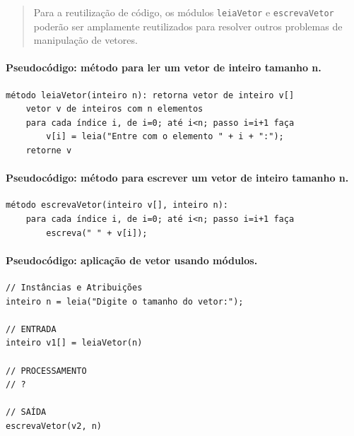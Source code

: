 \documentclass[12pt,a4paper]{article}
\begin{document}
\begin{quote}
Para a reutilização de código, os módulos \texttt{leiaVetor} e
\texttt{escrevaVetor} poderão ser amplamente reutilizados para resolver
outros problemas de manipulação de vetores.
\end{quote}

    \hypertarget{pseudocuxf3digo-muxe9todo-para-ler-um-vetor-de-inteiro-tamanho-n.}{%
\paragraph{Pseudocódigo: método para ler um vetor de inteiro tamanho
n.}\label{pseudocuxf3digo-muxe9todo-para-ler-um-vetor-de-inteiro-tamanho-n.}}

    \begin{verbatim}
método leiaVetor(inteiro n): retorna vetor de inteiro v[]
    vetor v de inteiros com n elementos
    para cada índice i, de i=0; até i<n; passo i=i+1 faça
        v[i] = leia("Entre com o elemento " + i + ":");
    retorne v
\end{verbatim}

    \hypertarget{pseudocuxf3digo-muxe9todo-para-escrever-um-vetor-de-inteiro-tamanho-n.}{%
\paragraph{Pseudocódigo: método para escrever um vetor de inteiro
tamanho
n.}\label{pseudocuxf3digo-muxe9todo-para-escrever-um-vetor-de-inteiro-tamanho-n.}}

    \begin{verbatim}
método escrevaVetor(inteiro v[], inteiro n):
    para cada índice i, de i=0; até i<n; passo i=i+1 faça
        escreva(" " + v[i]);
\end{verbatim}

    \hypertarget{pseudocuxf3digo-aplicauxe7uxe3o-de-vetor-usando-muxf3dulos.}{%
\paragraph{Pseudocódigo: aplicação de vetor usando
módulos.}\label{pseudocuxf3digo-aplicauxe7uxe3o-de-vetor-usando-muxf3dulos.}}

    \begin{verbatim}
// Instâncias e Atribuições
inteiro n = leia("Digite o tamanho do vetor:");

// ENTRADA
inteiro v1[] = leiaVetor(n)

// PROCESSAMENTO
// ?

// SAÍDA
escrevaVetor(v2, n)
\end{verbatim}
\end{document}
